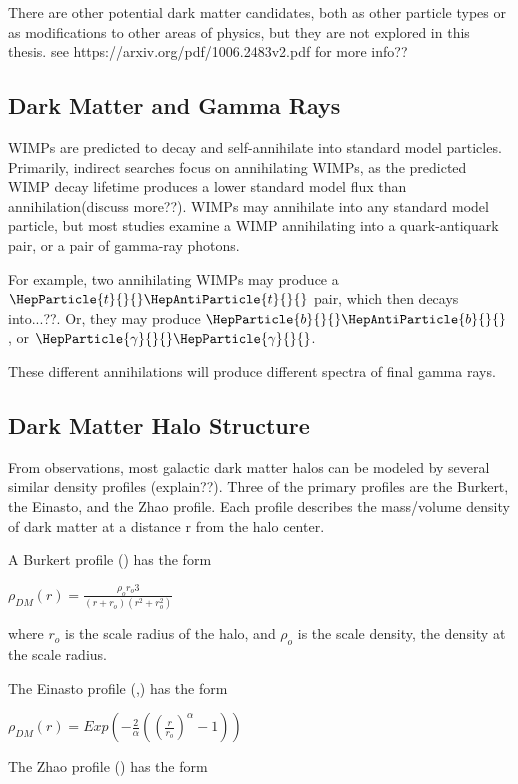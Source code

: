     There are other potential dark matter candidates, both as other particle types or as modifications to other areas of physics, but they are not explored in this thesis.
    see https://arxiv.org/pdf/1006.2483v2.pdf for more info??
  \subsection{Dark Matter and Gamma Rays}
    WIMPs are predicted to decay and self-annihilate into standard model particles.
    Primarily, indirect searches focus on annihilating WIMPs, as the predicted WIMP decay lifetime produces a lower standard model flux than annihilation(discuss more??).
    WIMPs may annihilate into any standard model particle, but most studies examine a WIMP annihilating into a quark-antiquark pair, or a pair of gamma-ray photons.

    For example, two annihilating WIMPs may produce a $\HepParticle{t}{}{}\HepAntiParticle{t}{}{}$ pair, which then decays into...??.
    Or, they may produce $\HepParticle{b}{}{}\HepAntiParticle{b}{}{}$, or $\HepParticle{\gamma}{}{}\HepParticle{\gamma}{}{}$.

    These different annihilations will produce different spectra of final gamma rays.
  \subsection{Dark Matter Halo Structure}
    From observations, most galactic dark matter halos can be modeled by several similar density profiles (explain??).
    Three of the primary profiles are the Burkert, the Einasto, and the Zhao profile.
    Each profile describes the mass/volume density of dark matter at a distance r from the halo center.

    A Burkert profile (\cite{burkertprofile}) has the form

    $ \rho_{DM} \left( r \right) = \frac{ \rho_o r_o3}{ \left( r + r_o \right) \left( r^2 + r_o^2 \right)} $ \label{eqn:burkert}

    where $r_o$ is the scale radius of the halo, and $\rho_o$ is the scale density, the density at the scale radius.

    The Einasto profile (\cite{einastoprofile1},\cite{einastoprofile2}) has the form

    $ \rho_{DM} \left( r \right) = Exp \left( - \frac{2}{\alpha} \left( {\left( \frac{r}{r_o} \right)}^{\alpha} - 1 \right) \right)$ \label{eqn:einasto}

    The Zhao profile (\cite{zhaoprofile}) has the form

